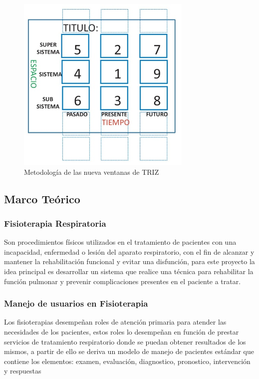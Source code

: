 \documentclass[12pt]{article}
\begin{document}
\begin{figure}[ht]
\centering
\includegraphics[scale=1.5]{imag/TRIZ.png}
\caption{Metodología de las nueva ventanas de TRIZ}
\label{1}
\end{figure}
\FloatBarrier








\subsection{Marco Teórico}

\subsubsection{Fisioterapia Respiratoria}

Son procedimientos físicos utilizados en el tratamiento de pacientes con una incapacidad, enfermedad o lesión del aparato respiratorio, con el fin de alcanzar y mantener la rehabilitación funcional y evitar una disfunción, para este proyecto la idea principal es desarrollar un sistema que realice una técnica para rehabilitar la función pulmonar y prevenir complicaciones presentes en el paciente a tratar.


\subsubsection{Manejo de usuarios en Fisioterapia}

Los fisioterapias desempeñan roles de atención primaria para atender las necesidades de los pacientes, estos roles lo desempeñan en función de prestar  servicios de tratamiento respiratorio donde se puedan obtener resultados de los mismos, a partir de ello se deriva un modelo de manejo de pacientes estándar que contiene los elementos:  examen, evaluación, diagnostico, pronostico, intervención y respuestas 
\end{document}
